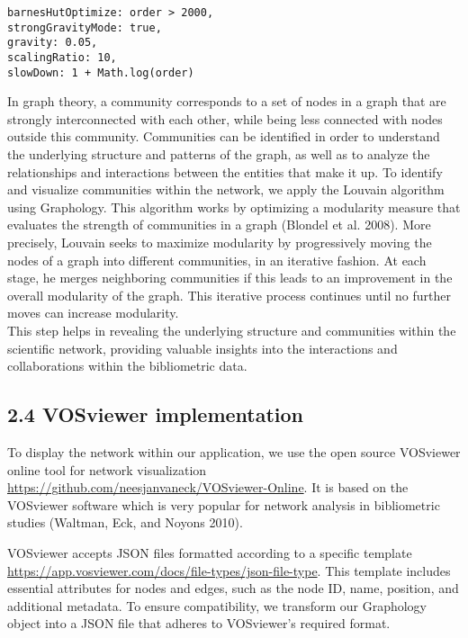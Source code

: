 \documentclass[
]{article}
\begin{document}
\begin{verbatim}
barnesHutOptimize: order > 2000,
strongGravityMode: true,
gravity: 0.05,
scalingRatio: 10,
slowDown: 1 + Math.log(order)
\end{verbatim}

In graph theory, a community corresponds to a set of nodes in a graph
that are strongly interconnected with each other, while being less
connected with nodes outside this community. Communities can be
identified in order to understand the underlying structure and patterns
of the graph, as well as to analyze the relationships and interactions
between the entities that make it up. To identify and visualize
communities within the network, we apply the Louvain algorithm using
Graphology. This algorithm works by optimizing a modularity measure that
evaluates the strength of communities in a graph (Blondel et al. 2008).
More precisely, Louvain seeks to maximize modularity by progressively
moving the nodes of a graph into different communities, in an iterative
fashion. At each stage, he merges neighboring communities if this leads
to an improvement in the overall modularity of the graph. This iterative
process continues until no further moves can increase modularity.\\
This step helps in revealing the underlying structure and communities
within the scientific network, providing valuable insights into the
interactions and collaborations within the bibliometric data.

\hypertarget{vosviewer-implementation}{%
\subsection{2.4 VOSviewer
implementation}\label{vosviewer-implementation}}

To display the network within our application, we use the open source
VOSviewer online tool for network visualization
\url{https://github.com/neesjanvaneck/VOSviewer-Online}. It is based on
the VOSviewer software which is very popular for network analysis in
bibliometric studies (Waltman, Eck, and Noyons 2010).

VOSviewer accepts JSON files formatted according to a specific template
\url{https://app.vosviewer.com/docs/file-types/json-file-type}. This
template includes essential attributes for nodes and edges, such as the
node ID, name, position, and additional metadata. To ensure
compatibility, we transform our Graphology object into a JSON file that
adheres to VOSviewer's required format.
\end{document}
